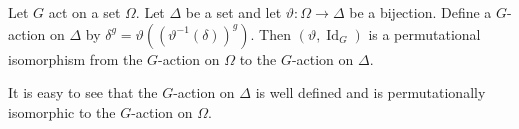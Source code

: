 \begin{proposition}
	Let $G$ act on a set $\Omega$. Let $\Delta$ be a set and let $\vartheta: \Omega \to \Delta$ be a bijection. Define a $G$-action on $\Delta$ by $\delta^g = \vartheta((\vartheta^{-1}(\delta))^g)$. Then $(\vartheta, \operatorname{Id}_G)$ is a permutational isomorphism from the $G$-action on $\Omega$ to the $G$-action on $\Delta$.
\end{proposition}

\begin{sketch}
	It is easy to see that the $G$-action on $\Delta$ is well defined and is permutationally isomorphic to the $G$-action on $\Omega$. 
\end{sketch}

\begin{comment}
	\begin{proposition}
		Let $G_1$ and $G_2$ be groups acting transitively on $\Omega_1$ and $\Omega_2$, respectively. Then the following are equivalent.
		\begin{enumerate}[(1)]
			\item The actions of $G_1$ and $G_2$ on $\Omega_1$ and $\Omega_2$, respectively, are permutationally isomorphic.
			\item There exist $\omega_1 \in \Omega_1$ and $\omega_2 \in \Omega_2$ and an isomorphism $\alpha: G_1 \to G_2$ such that $\alpha(G_1)_{\omega_1} = (G_2)_{\omega_2}$.
			\item For all $\omega_1 \in \Omega_1$ and $\omega_2 \in \Omega_2$, there exists an isomorphism $\alpha: G_1 \to G_2$ such that $\alpha(G_1)_{\omega_1} = (G_2)_{\omega_2}$.
		\end{enumerate}
	\end{proposition}
	
	\begin{sketch}
		(1) $\Rightarrow$ (2) Let $(\gamma: \Omega_1 \to \Omega_2, \alpha: G_1 \to G_2)$ be a permutational isomorphism. Let $\omega_1 \in \Omega_1$ and $g \in (G_1)_{\omega_1}$. Then $\gamma(\omega_1) ^{\alpha (g)} = \gamma(\omega_1^g) = \gamma(\omega_1)$, and so $\alpha(g) \in (G_2)_{\gamma(\omega_1)}$. Therefore $\alpha(G_1)_{\omega_1} \le (G_2)_{\omega_1\gamma}$. 
		
		On the other hand if $g_2 \in (G_2)_{\omega_1\gamma}$ then there is some $g_1 \in G_1$ such that $g_1\alpha = g_2$. Then $\omega_1\gamma = (\omega_1\gamma)g_2 = (\omega_1\gamma)(g_1\alpha) = (\omega_1 g_1)\gamma$. Applying $\gamma^{-1}$ we obtain $\omega_1 = \omega_1 g_1$. Therefore $g_1 \in (G_1)_{\omega_1}$, and hence $g_2 = g_1\alpha \in (G_1)_{\omega_1}\alpha$. This shows that $(G_1)_{\omega_1}\alpha = (G_2)_{\omega_1\gamma}$, and assertion (ii) is valid.
		

\end{comment}
